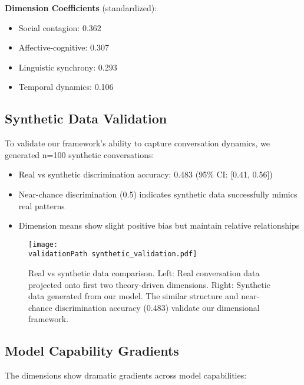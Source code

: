 \documentclass[11pt,letterpaper]{article}
\newcommand{\socialContagionCoef}{0.362}
\newcommand{\affectiveCognitiveCoef}{0.307}
\newcommand{\linguisticSynchronyCoef}{0.293}
\newcommand{\temporalDynamicsCoef}{0.106}
\newcommand{\syntheticDiscriminationAccuracy}{0.483}
\newcommand{\syntheticDiscriminationCI}{[0.41, 0.56]}
\newcommand{\validationPath}{../analysis/rigorous_analysis_outputs/validation/}
\begin{document}
\textbf{Dimension Coefficients} (standardized):
\begin{itemize}
    \item Social contagion: \socialContagionCoef{}
    \item Affective-cognitive: \affectiveCognitiveCoef{}
    \item Linguistic synchrony: \linguisticSynchronyCoef{}
    \item Temporal dynamics: \temporalDynamicsCoef{}
\end{itemize}

\subsection{Synthetic Data Validation}

To validate our framework's ability to capture conversation dynamics, we generated n=100 synthetic conversations:

\begin{itemize}
    \item Real vs synthetic discrimination accuracy: \syntheticDiscriminationAccuracy{} (95\% CI: \syntheticDiscriminationCI{})
    \item Near-chance discrimination (0.5) indicates synthetic data successfully mimics real patterns
    \item Dimension means show slight positive bias but maintain relative relationships
\end{itemize}

\begin{figure}[htbp]
\centering
\texttt{[image: \\validationPath synthetic\_validation.pdf]}
\caption{Real vs synthetic data comparison. Left: Real conversation data projected onto first two theory-driven dimensions. Right: Synthetic data generated from our model. The similar structure and near-chance discrimination accuracy (\syntheticDiscriminationAccuracy{}) validate our dimensional framework.}
\label{fig:synthetic_validation}
\end{figure}

\subsection{Model Capability Gradients}

The dimensions show dramatic gradients across model capabilities:
\end{document}
